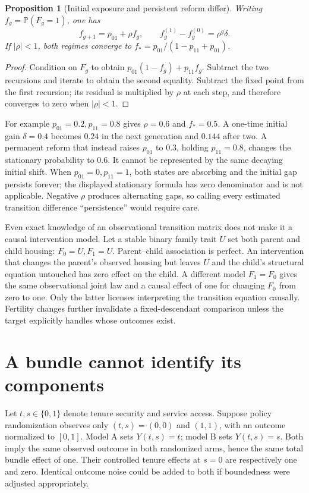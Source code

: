 \documentclass[11pt,a4paper]{article}
\newtheorem{proposition}[theorem]{Proposition}
\newcommand{\Prb}{\mathbb P}
\begin{document}
\begin{proposition}[Initial exposure and persistent reform differ]
Writing $f_g=\Prb(F_g=1)$, one has
\[
 f_{g+1}=p_{01}+\rho f_g,\qquad
 f_g^{(1)}-f_g^{(0)}=\rho^g\delta.                    \tag{2}
\]
If $|\rho|<1$, both regimes converge to
$f_*=p_{01}/(1-p_{11}+p_{01})$.
\end{proposition}
\begin{proof}
Condition on $F_g$ to obtain $p_{01}(1-f_g)+p_{11}f_g$. Subtract the two recursions and iterate to obtain the second equality. Subtract the fixed point from the first recursion; its residual is multiplied by $\rho$ at each step, and therefore converges to zero when $|\rho|<1$.
\end{proof}

For example $p_{01}=0.2,p_{11}=0.8$ gives $\rho=0.6$ and $f_*=0.5$. A one-time initial gain $\delta=0.4$ becomes $0.24$ in the next generation and $0.144$ after two. A permanent reform that instead raises $p_{01}$ to $0.3$, holding $p_{11}=0.8$, changes the stationary probability to $0.6$. It cannot be represented by the same decaying initial shift. When $p_{01}=0,p_{11}=1$, both states are absorbing and the initial gap persists forever; the displayed stationary formula has zero denominator and is not applicable. Negative $\rho$ produces alternating gaps, so calling every estimated transition difference ``persistence'' would require care.

Even exact knowledge of an observational transition matrix does not make it a causal intervention model. Let a stable binary family trait $U$ set both parent and child housing: $F_0=U,F_1=U$. Parent--child association is perfect. An intervention that changes the parent's observed housing but leaves $U$ and the child's structural equation untouched has zero effect on the child. A different model $F_1=F_0$ gives the same observational joint law and a causal effect of one for changing $F_0$ from zero to one. Only the latter licenses interpreting the transition equation causally. Fertility changes further invalidate a fixed-descendant comparison unless the target explicitly handles whose outcomes exist.

\section{A bundle cannot identify its components}
Let $t,s\in\{0,1\}$ denote tenure security and service access. Suppose policy randomization observes only $(t,s)=(0,0)$ and $(1,1)$, with an outcome normalized to $[0,1]$. Model A sets $Y(t,s)=t$; model B sets $Y(t,s)=s$. Both imply the same observed outcome in both randomized arms, hence the same total bundle effect of one. Their controlled tenure effects at $s=0$ are respectively one and zero. Identical outcome noise could be added to both if boundedness were adjusted appropriately.
\end{document}
